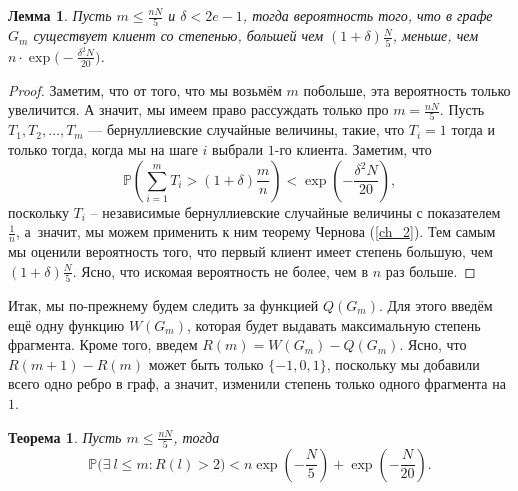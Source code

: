 \documentclass{matmex-diploma-custom}
\newcommand{\PRob}{\mathbb P}
\newcommand{\leqs}{\leqslant}
\newtheorem{theorem}{Теорема}
\newtheorem{lemma}{Лемма}
\theoremstyle{named}
\begin{document}
\begin{lemma}\label{l4}
Пусть $m \leqs \frac{nN}{5}$ и $\delta < 2e - 1$, тогда вероятность того, что в графе $G_m$ существует клиент 
со степенью, большей чем $(1+\delta)\frac{N}{5}$, меньше, чем $n \cdot \exp\big(- \frac{\delta^2 N}{20}\big)$.
\end{lemma}
\begin{proof}
Заметим, что от того, что мы возьмём $m$ побольше, эта вероятность только увеличится. 
А значит, мы имеем право рассуждать только про $m = \frac{nN}{5}$. 
Пусть $T_1, T_2, \dots, T_m$ --- бернуллиевские случайные величины, такие, что $T_i = 1$ тогда и только тогда, 
когда мы на шаге $i$ выбрали $1$-го клиента.
Заметим, что 
\begin{equation}
\PRob\left(\sum_{i = 1}^m T_i > (1+\delta)\frac{m}{n} \right) < \exp\left(- \frac{\delta^2 N}{20} \right),
\end{equation}
поскольку $T_i$ -- независимые бернуллиевские случайные величины с показателем $\frac{1}{n}$, 
а~значит, мы можем применить к ним теорему Чернова (\ref{ch_2}).
Тем самым мы оценили вероятность того, что первый клиент имеет степень большую, чем $(1+\delta)\frac{N}{5}$.
Ясно, что искомая вероятность не более, чем в $n$ раз больше.
\end{proof}

Итак, мы по-прежнему будем следить за функцией $Q(G_m)$. Для этого введём ещё одну функцию $W(G_m)$, 
которая будет выдавать максимальную степень фрагмента.
Кроме того, введем $R(m) = W(G_m) - Q(G_m)$. 
Ясно, что $R(m+1) - R(m)$ может быть только $\{-1,0,1\}$, поскольку мы добавили всего одно ребро в граф, 
а значит, изменили степень только одного фрагмента на $1$. 

\begin{theorem}\label{t4}
Пусть $m \leqs \frac{nN}{5}$, тогда
\begin{equation}
\PRob\Big(\exists~l \leqs m : R(l) > 2 \Big) < n\exp\left(-\frac{N}{5}\right) +  \exp\left(- \frac{N}{20}\right).
\end{equation}
\end{theorem}
\end{document}
